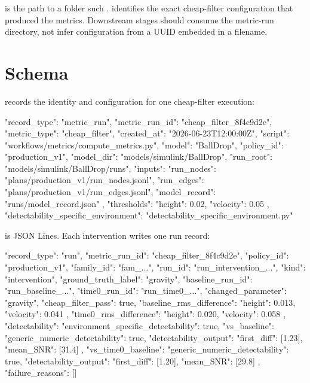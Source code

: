 \documentclass[11pt]{article}
\begin{document}
 is the path to a folder such .
 identifies the exact cheap-filter configuration that produced the metrics.
Downstream stages should consume the metric-run directory, not infer configuration from a UUID embedded in a filename.

\section*{Schema}

 records the identity and configuration for one cheap-filter execution:

\begin{DocCode}
{
  "record_type": "metric_run",
  "metric_run_id": "cheap_filter_8f4c9d2e",
  "metric_type": "cheap_filter",
  "created_at": "2026-06-23T12:00:00Z",
  "script": "workflows/metrics/compute_metrics.py",
  "model": "BallDrop",
  "policy_id": "production_v1",
  "model_dir": "models/simulink/BallDrop",
  "run_root": "models/simulink/BallDrop/runs",
  "inputs": {
    "run_nodes": "plans/production_v1/run_nodes.jsonl",
    "run_edges": "plans/production_v1/run_edges.jsonl",
    "model_record": "runs/model_record.json"
  },
  "thresholds": {
    "height": 0.02,
    "velocity": 0.05
  },
  "detectability_specific_environment": "detectability_specific_environment.py"
}
\end{DocCode}

 is JSON Lines.
Each intervention writes one run record:

\begin{DocCode}
{
  "record_type": "run",
  "metric_run_id": "cheap_filter_8f4c9d2e",
  "policy_id": "production_v1",
  "family_id": "fam_...",
  "run_id": "run_intervention_...",
  "kind": "intervention",
  "ground_truth_label": "gravity",
  "baseline_run_id": "run_baseline_...",
  "time0_run_id": "run_time0_...",
  "changed_parameter": "gravity",
  "cheap_filter_pass": true,
  "baseline_rms_difference": {
    "height": 0.013,
    "velocity": 0.041
  },
  "time0_rms_difference": {
    "height": 0.020,
    "velocity": 0.058
  },
  "detectability": {
    "environment_specific_detectability": true,
    "vs_baseline": {
      "generic_numeric_detectability": true,
      "detectability_output": {
        "first_diff": [1.23],
        "mean_SNR": [31.4]
      }
    },
    "vs_time0_baseline": {
      "generic_numeric_detectability": true,
      "detectability_output": {
        "first_diff": [1.20],
        "mean_SNR": [29.8]
      }
    }
  },
  "failure_reasons": []
}
\end{DocCode}
\end{document}
